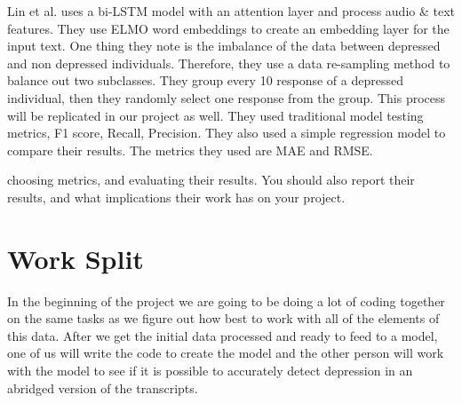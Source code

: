 Lin et al. uses a bi-LSTM model with an attention layer and process audio & text features. They use ELMO word embeddings to create an embedding layer for the input text. One thing they note is the imbalance of the data between depressed and non depressed individuals. Therefore, they use a data re-sampling method to balance out two subclasses. They group every 10 response of a depressed individual, then they randomly select one response from the group. This process will be replicated in our project as well. They used traditional model testing metrics, F1 score, Recall, Precision. They also used a simple regression model to compare their results. The metrics they used are MAE and RMSE.





 choosing metrics, and evaluating their results. You
should also report their results, and what implications their work has
on your project.




\section{Work Split}

In the beginning of the project we are going to be doing a lot of coding together on the same tasks as we figure out how best to work with all of the elements of this data. After we get the initial data processed and ready to feed to a model, one of us will write the code to create the model and the other person will work with the model to see if it is possible to accurately detect depression in an abridged version of the transcripts. 